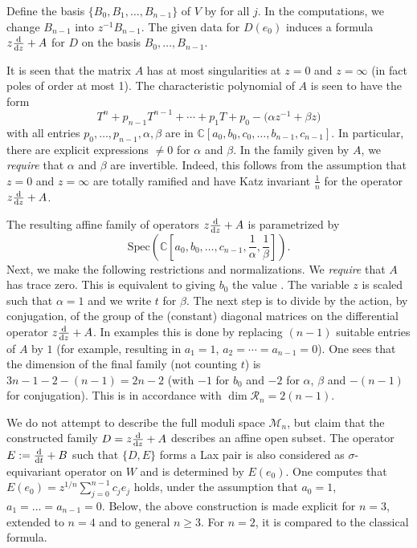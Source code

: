 \documentclass[10pt,a4paper]{amsart}
\numberwithin{equation}{section}
\begin{document}
Define the basis $\{B_0,B_1,\dots ,B_{n-1}\}$ of $V$ by  for all $j$.
In the computations, we change $B_{n-1}$
into $z^{-1}B_{n-1}$. The given data for $D(e_0)$ induces a formula $z\frac{{\rm d}}{{\rm d}z}+A$ for $D$ on the basis $B_0,\dots ,B_{n-1}$.

 It is seen that the matrix $A$ has at most singularities at $z=0$ and $z=\infty$ (in fact poles of order at most 1). The characteristic polynomial of $A$ is seen to have the form
 \[
 T^n+p_{n-1}T^{n-1}+\cdots +p_1T+p_0-\bigl(\alpha z^{-1}+\beta z\bigr)
 \]
 with all entries $p_0,\dots ,p_{n-1},\alpha , \beta$ are in $\mathbb{C}[a_0,b_0,c_0,\dots ,b_{n-1},c_{n-1}]$.
 In particular, there are explicit expressions $\neq 0$ for $\alpha$ and $\beta$. In the family given by $A$, we {\it require} that $\alpha$ and $\beta$
 are invertible. Indeed, this follows from the assumption that $z=0$ and $z=\infty$ are totally ramified and have Katz invariant
 $\frac{1}{n}$ for the operator $z\frac{{\rm d}}{{\rm d}z}+A$.



 The resulting affine family of operators $z\frac{{\rm d}}{{\rm d}z}+A$ is parametrized by
 \[
 \textrm{Spec}\left(\mathbb{C}\left[a_0,b_0,\dots ,c_{n-1},\frac{1}{\alpha}, \frac{1}{\beta}\right]\right).
 \]
 Next, we make the following
restrictions and normalizations. We {\it require} that $A$ has trace zero. This is equivalent to giving
$b_0$ the value . The variable $z$ is scaled such that $\alpha=1$ and we write $t$ for $\beta$.
The next step is to divide by the action, by conjugation, of the group of the (constant) diagonal matrices on the differential operator $z\frac{{\rm d}}{{\rm d}z}+A$. In examples this is done by replacing $(n-1)$ suitable entries of $A$ by $1$ (for example, resulting in $a_1=1$, $a_2=\cdots =a_{n-1}=0$). One sees that the dimension of the final family (not counting $t$) is $3n-1-2-(n-1)=2n-2$ (with $-1$ for $b_0$ and $-2$ for $\alpha$, $\beta$ and $-(n-1)$ for conjugation).
This is in accordance with $\dim \mathcal{R}_n=2(n-1)$.



We do not attempt to describe the full moduli space $\mathcal{M}_n$, but claim that the constructed family
$D=z\frac{{\rm d}}{{\rm d}z}+A$ describes an affine open subset. The operator $E:=\frac{{\rm d}}{{\rm d}t}+B$ such that $\{D,E\}$ forms
a Lax pair is also considered as $\sigma$-equivariant operator on $W$ and is determined by $E(e_0)$. One computes that
$E(e_0)=z^{1/n}\sum _{j=0}^{n-1}c_je_j$ holds, under the assumption that $a_0=1$, $a_1=\dots =a_{n-1}=0$.
Below, the above construction is made explicit for $n=3$, extended to $n=4$ and to general $n\geq 3$. For $n=2$, it is compared
to the classical formula.
\end{document}
